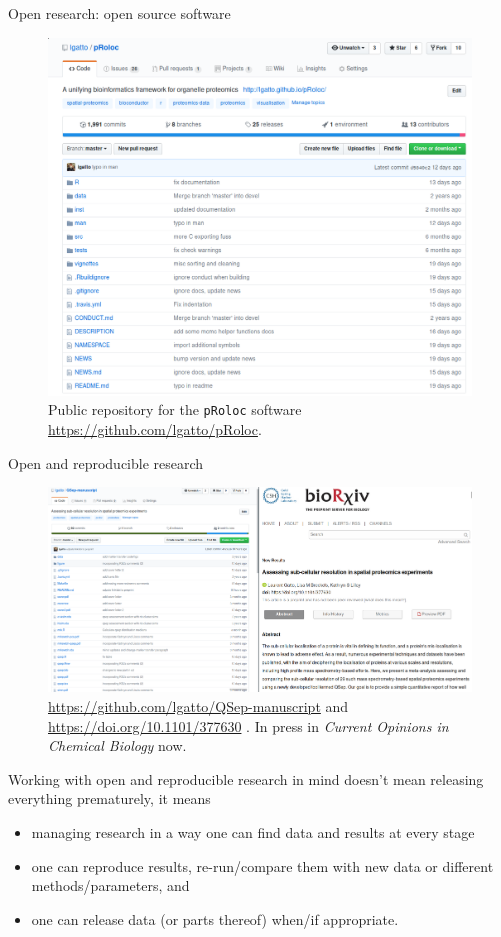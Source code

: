 \begin{frame}{Open research: open source software}
  \centering
  \begin{figure}
  \includegraphics[width=.8\linewidth]{./figs/pRoloc_screen.png}
    \caption{Public repository for the \texttt{pRoloc} software
      \url{https://github.com/lgatto/pRoloc}.}
  \end{figure}
\end{frame}

\begin{frame}{Open and reproducible research}
  \centering
  \begin{figure}
    \includegraphics[width=1\linewidth]{./figs/qsep_screen.png}
    \caption{\url{https://github.com/lgatto/QSep-manuscript} and
      \url{https://doi.org/10.1101/377630} \citep{Gatto:2018}. In
      press in \textit{Current Opinions in Chemical Biology} now.}
  \end{figure}
\end{frame}

\begin{frame}{}
Working with open and reproducible research in mind doesn't mean
releasing everything prematurely, it means

\begin{itemize}
\item managing research in a way one can find data and results at
  every stage

\item one can reproduce results, re-run/compare them with new data or
  different methods/parameters, and

\item  one can release data (or parts thereof) when/if appropriate.
\end{itemize}
\end{frame}
